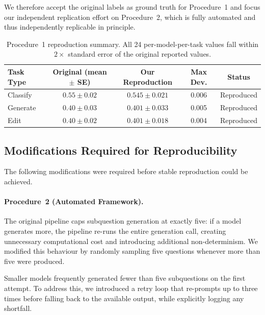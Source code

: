 \documentclass[sigconf,authordraft]{acmart}
\begin{document}
We therefore accept the original labels as ground truth for Procedure~1 and focus our independent replication effort on Procedure~2, which is fully automated and thus independently replicable in principle.

\begin{table}[t]
\small
\centering
\setlength{\tabcolsep}{4pt}
\renewcommand{\arraystretch}{1.15}
\begin{tabularx}{\columnwidth}{l c c c c}
\toprule
\textbf{Task Type} & \textbf{Original (mean $\pm$ SE)} & \textbf{Our Reproduction} & \textbf{Max Dev.} & \textbf{Status} \\
\midrule
Classify & $0.55 \pm 0.02$ & $0.545 \pm 0.021$ & 0.006 & Reproduced \\
Generate & $0.40 \pm 0.03$ & $0.401 \pm 0.033$ & 0.005 & Reproduced \\
Edit     & $0.40 \pm 0.02$ & $0.401 \pm 0.018$ & 0.004 & Reproduced \\
\bottomrule
\end{tabularx}
\caption{Procedure~1 reproduction summary. All 24 per-model-per-task values fall within $2\times$ standard error of the original reported values.}
\label{tab:proc1-repro}
\end{table}

\subsection{Modifications Required for Reproducibility}
\label{sec:modifications}

The following modifications were required before stable reproduction could be achieved.

\paragraph{Procedure~2 (Automated Framework).}
The original pipeline caps subquestion generation at exactly five: if a model generates more, the pipeline re-runs the entire generation call, creating unnecessary computational cost and introducing additional non-determinism. We modified this behaviour by randomly sampling five questions whenever more than five were produced.

Smaller models frequently generated fewer than five subquestions on the first attempt. To address this, we introduced a retry loop that re-prompts up to three times before falling back to the available output, while explicitly logging any shortfall.
\end{document}
